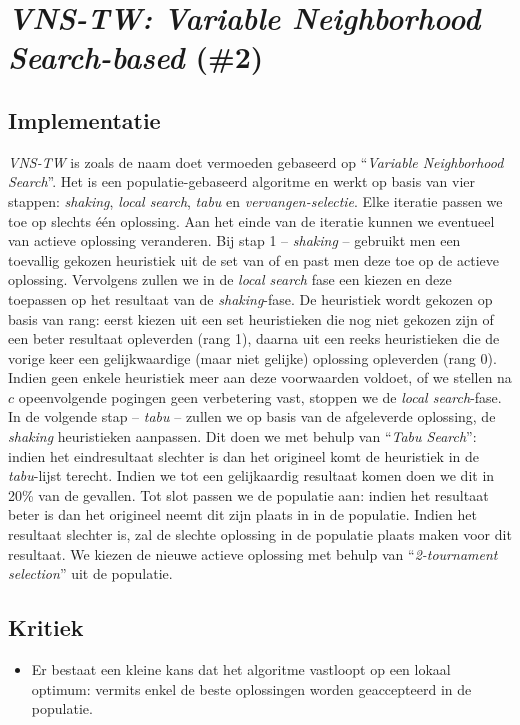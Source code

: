 \section{\emph{VNS-TW: Variable Neighborhood Search-based} (\#2)}
\label{sss:vns-tw}
\subsection{Implementatie}
\emph{VNS-TW}\cite{chesc-vns-tw} is zoals de naam doet vermoeden gebaseerd op ``\emph{Variable Neighborhood Search}''\cite{hom/vns}. Het is een populatie-gebaseerd algoritme en werkt op basis van vier stappen: \emph{shaking}, \emph{local search}, \emph{tabu} en \emph{vervangen-selectie}. Elke iteratie passen we toe op slechts \'e\'en oplossing. Aan het einde van de iteratie kunnen we eventueel van actieve oplossing veranderen. Bij stap 1 -- \emph{shaking} -- gebruikt men een toevallig gekozen heuristiek uit de set van \abmt{} of \abrr{} \abllhn{} en past men deze toe op de actieve oplossing. Vervolgens zullen we in de \emph{local search} fase een \abls{} \abh{} kiezen en deze toepassen op het resultaat van de \emph{shaking}-fase. De heuristiek wordt gekozen op basis van rang: eerst kiezen uit een set heuristieken die nog niet gekozen zijn of een beter resultaat opleverden (rang 1), daarna uit een reeks heuristieken die de vorige keer een gelijkwaardige (maar niet gelijke) oplossing opleverden (rang 0). Indien geen enkele heuristiek meer aan deze  voorwaarden voldoet, of we stellen na $c$ opeenvolgende pogingen geen verbetering vast, stoppen we de \emph{local search}-fase. In de volgende stap -- \emph{tabu} -- zullen we op basis van de afgeleverde oplossing, de \emph{shaking} heuristieken aanpassen. Dit doen we met behulp van ``\emph{Tabu Search}''\cite{DBLP:journals/informs/Glover89}: indien het eindresultaat slechter is dan het origineel komt de heuristiek in de \emph{tabu}-lijst terecht. Indien we tot een gelijkaardig resultaat komen doen we dit in 20\% van de gevallen. Tot slot passen we de populatie aan: indien het resultaat beter is dan het origineel neemt dit zijn plaats in in de populatie. Indien het resultaat slechter is, zal de slechte oplossing in de populatie plaats maken voor dit resultaat. We kiezen de nieuwe actieve oplossing met behulp van ``\emph{2-tournament selection}''\cite{Miller95geneticalgorithms} uit de populatie.
\subsection{Kritiek}
\begin{itemize}
 \item Er bestaat een kleine kans dat het algoritme vastloopt op een lokaal optimum: vermits enkel de beste oplossingen worden geaccepteerd in de populatie.
\end{itemize}